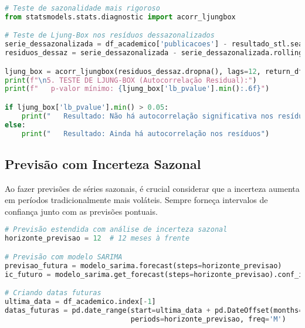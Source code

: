 \begin{pythonbox}
\begin{lstlisting}[language=Python]
# Teste de sazonalidade mais rigoroso
from statsmodels.stats.diagnostic import acorr_ljungbox

# Teste de Ljung-Box nos resíduos dessazonalizados
serie_dessazonalizada = df_academico['publicacoes'] - resultado_stl.seasonal
residuos_dessaz = serie_dessazonalizada - serie_dessazonalizada.rolling(12).mean()

ljung_box = acorr_ljungbox(residuos_dessaz.dropna(), lags=12, return_df=True)
print(f"\n5. TESTE DE LJUNG-BOX (Autocorrelação Residual):")
print(f"   p-valor mínimo: {ljung_box['lb_pvalue'].min():.6f}")

if ljung_box['lb_pvalue'].min() > 0.05:
    print("   Resultado: Não há autocorrelação significativa nos resíduos")
else:
    print("   Resultado: Ainda há autocorrelação nos resíduos")
\end{lstlisting}
\end{pythonbox}

\subsection{Previsão com Incerteza Sazonal}

\begin{warningbox}
Ao fazer previsões de séries sazonais, é crucial considerar que a incerteza aumenta em períodos tradicionalmente mais voláteis. Sempre forneça intervalos de confiança junto com as previsões pontuais.
\end{warningbox}

\begin{pythonbox}
\begin{lstlisting}[language=Python]
# Previsão estendida com análise de incerteza sazonal
horizonte_previsao = 12  # 12 meses à frente

# Previsão com modelo SARIMA
previsao_futura = modelo_sarima.forecast(steps=horizonte_previsao)
ic_futuro = modelo_sarima.get_forecast(steps=horizonte_previsao).conf_int()

# Criando datas futuras
ultima_data = df_academico.index[-1]
datas_futuras = pd.date_range(start=ultima_data + pd.DateOffset(months=1), 
                              periods=horizonte_previsao, freq='M')
\end{lstlisting}
\end{pythonbox}


